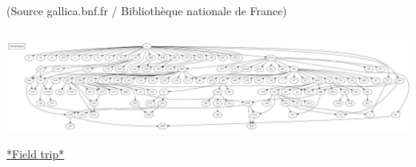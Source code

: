 \documentclass[10pt]{beamer}
\begin{document}
\begin{frame}
\begin{columns}
\begin{column}{0.45\textwidth}
\begin{overlayarea}{\textwidth}{0.5\textheight}
{						\tiny (Source gallica.bnf.fr / Bibliothèque nationale de France)
					}
				\end{overlayarea}
			\end{column}
		\end{columns}
		\begin{center}
			\includegraphics[width=\textwidth]{../img/global-stemma-complete.pdf}
		\end{center}	
	\end{frame}
	\begin{frame}
		\begin{center}
			\href{../img/global-stemma-complete-reoriented.pdf}{*Field trip*}
		\end{center}
	\end{frame}
\end{document}

